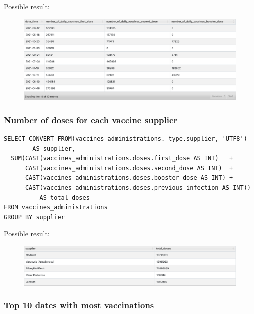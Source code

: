 \documentclass[12pt, a4paper]{article}
\begin{document}
\noindent
Possible result:
\begin{figure}[ht]
  \centering
  \includegraphics[width=\linewidth]{hbase_query_1.png}
\end{figure}

\subsubsection{Number of doses for each vaccine supplier}

\begin{tcolorbox}[fontupper=\scriptsize]
  \begin{verbatim}
SELECT CONVERT_FROM(vaccines_administrations._type.supplier, 'UTF8') 
        AS supplier,
  SUM(CAST(vaccines_administrations.doses.first_dose AS INT)   + 
      CAST(vaccines_administrations.doses.second_dose AS INT)  + 
      CAST(vaccines_administrations.doses.booster_dose AS INT) +
      CAST(vaccines_administrations.doses.previous_infection AS INT)) 
          AS total_doses
FROM vaccines_administrations
GROUP BY supplier
  \end{verbatim}
\end{tcolorbox}

\clearpage %

\noindent
Possible result:
\begin{figure}[ht]
  \centering
  \includegraphics[width=\linewidth]{hbase_query_2.png}
\end{figure}

\subsubsection{Top 10 dates with most vaccinations}
\end{document}
